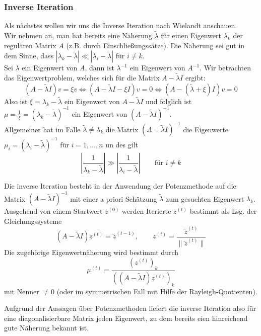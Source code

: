 \documentclass{article}
\begin{document}
    \subsubsection{Inverse Iteration} 
    Als nächstes wollen wir uns die \glqq{}Inverse Iteration\grqq{} nach
    Wielandt anschauen. \\
    Wir nehmen an, man hat bereits eine Näherung $\tilde{\lambda}$ für einen Eigenwert $\lambda_k$ der regulären Matrix 
    $A$ (z.B. durch Einschließungssätze). Die Näherung sei gut in dem Sinne, 
    dass $|\lambda_k-\tilde{\lambda}|\ll |\lambda_i-\tilde{\lambda}|$ für $i\neq k$.\\
    Sei $\lambda$ ein Eigenwert von $A$, dann ist $\lambda^{-1}$ ein Eigenwert von $A^{-1}$. 
    Wir betrachten das Eigenwertproblem, welches sich für die Matrix $A-\tilde{\lambda}I$ ergibt:
    \[(A-\tilde{\lambda}I)v=\xi v \iff (A-\tilde{\lambda}I-\xi I)v = 0 \iff (A-(\tilde{\lambda}+\xi)I)v=0\]
    Also ist $\xi=\lambda_k-\tilde{\lambda}$ ein Eigenwert von $A-\tilde{\lambda}I$ und folglich ist 
    $\mu=\tfrac{1}{\xi}=(\lambda_k-\tilde{\lambda})^{-1}$ ein Eigenwert von $(A-\tilde{\lambda}I)^{-1}$. \\
    Allgemeiner hat im Falle $\tilde{\lambda}\neq\lambda_k$ die Matrix $(A-\tilde{\lambda}I)^{-1}$ die Eigenwerte 
    $\mu_i = (\lambda_i-\tilde{\lambda})^{-1}$ für $i=1,\dotsc,n$ un des gilt 
    \[\left|\dfrac{1}{\lambda_k-\tilde{\lambda}}\right| \gg \left|\dfrac{1}{\lambda_i-\tilde{\lambda}}\right|\qquad 
    \text{für } i\neq k\]
    \begin{defbox}
        Die inverse Iteration besteht in der Anwendung der Potenzmethode auf die Matrix $(A-\tilde{\lambda}I)^{-1}$
        mit einer a priori Schätzung $\tilde{\lambda}$ zum gesuchten Eigenwert $\lambda_k$. \\ 
        Ausgehend von einem Startwert $z^{(0)}$ werden Iterierte $z^{(t)}$ bestimmt als Lsg. der Gleichungssysteme
        \[(A-\tilde{\lambda}I)z^{(t)} = \tilde{z}^{(t-1)},
        \qquad z^{(t)} = \dfrac{\tilde{z}^{(t)}}{\|\tilde{z}^{(t)}\|}\]
        Die zugehörige Eigenwertnäherung wird bestimmt durch 
        \[\mu^{(t)}=\dfrac{(z^{(t)})_k}{((A-\tilde{\lambda}I)z^{(t)})_k}\]
        mit Nenner $\neq 0$ (oder im symmetrischen Fall mit Hilfe der Rayleigh-Quotienten).
    \end{defbox}
    Aufgrund der Aussagen über Potenzmethoden liefert die inverse Iteration also für eine diagonalisierbare Matrix
    jeden Eigenwert, zu dem bereits eien hinreichend gute Näherung bekannt ist.
\end{document}
